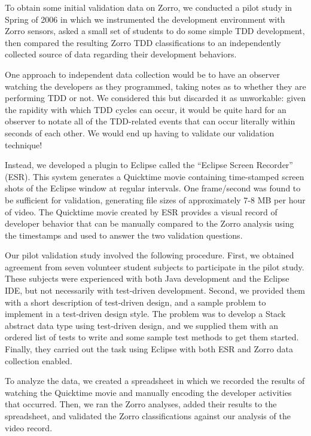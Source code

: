 \documentclass[11pt,twocolumn]{article}
\begin{document}
To obtain some initial validation data on Zorro, we conducted a pilot study
in Spring of 2006 in which we instrumented the development environment with
Zorro sensors, asked a small set of students to do some simple TDD
development, then compared the resulting Zorro TDD classifications to an
independently collected source of data regarding their development
behaviors.

One approach to independent data collection would be to have an observer
watching the developers as they programmed, taking notes as to whether they
are performing TDD or not.  We considered this but discarded it as
unworkable: given the rapidity with which TDD cycles can occur, it would be
quite hard for an observer to notate all of the TDD-related events that can
occur literally within seconds of each other. We would end up having to
validate our validation technique!

Instead, we developed a plugin to Eclipse called the ``Eclipse
Screen Recorder'' (ESR).  This system generates a Quicktime movie
containing time-stamped screen shots of the Eclipse window at regular
intervals. One frame/second was found to be sufficient for validation,
generating file sizes of approximately 7-8 MB per hour of video.  The
Quicktime movie created by ESR provides a visual record of developer
behavior that can be manually compared to the Zorro analysis using the
timestamps and used to answer the two validation questions.

Our pilot validation study involved the following procedure. First, we
obtained agreement from seven volunteer student subjects to participate in
the pilot study. These subjects were experienced with both Java development
and the Eclipse IDE, but not necessarily with test-driven development.
Second, we provided them with a short description of test-driven design,
and a sample problem to implement in a test-driven design style.  The
problem was to develop a Stack abstract data type using test-driven design,
and we supplied them with an ordered list of tests to write and some sample
test methods to get them started.  Finally, they carried out the task using
Eclipse with both ESR and Zorro data collection enabled.

To analyze the data, we created a spreadsheet in which we recorded the
results of watching the Quicktime movie and manually encoding the developer
activities that occurred.  Then, we ran the Zorro analyses, added their
results to the spreadsheet, and validated the Zorro classifications against
our analysis of the video record.
\end{document}
